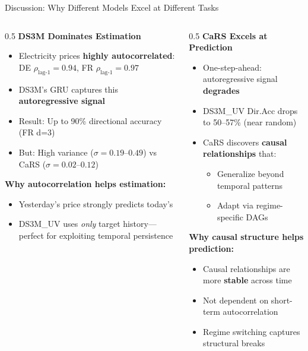\documentclass[aspectratio=169]{beamer}
\begin{document}
\begin{frame}{Discussion: Why Different Models Excel at Different Tasks}
\small
\begin{columns}
\begin{column}{0.5\textwidth}
\textbf{DS3M Dominates Estimation}
\begin{itemize}
    \item Electricity prices \textbf{highly autocorrelated}: DE $\rho_{\text{lag-1}} = 0.94$, FR $\rho_{\text{lag-1}} = 0.97$
    \item DS3M's GRU captures this \textbf{autoregressive signal}
    \item Result: Up to 90\% directional accuracy (FR d=3)
    \item \textcolor{warnred}{But:} High variance ($\sigma = 0.19$--$0.49$) vs CaRS ($\sigma = 0.02$--$0.12$)
\end{itemize}

\textbf{Why autocorrelation helps estimation:}
\begin{itemize}
    \item Yesterday's price strongly predicts today's
    \item DS3M\_UV uses \textit{only} target history---perfect for exploiting temporal persistence
\end{itemize}
\end{column}

\begin{column}{0.5\textwidth}
\textbf{CaRS Excels at Prediction}
\begin{itemize}
    \item One-step-ahead: autoregressive signal \textbf{degrades}
    \item DS3M\_UV Dir.Acc drops to 50--57\% (near random)
    \item CaRS discovers \textbf{causal relationships} that:
    \begin{itemize}
        \item Generalize beyond temporal patterns
        \item Adapt via regime-specific DAGs
    \end{itemize}
\end{itemize}

\textbf{Why causal structure helps prediction:}
\begin{itemize}
    \item Causal relationships are more \textbf{stable} across time
    \item Not dependent on short-term autocorrelation
    \item Regime switching captures structural breaks
\end{itemize}
\end{column}
\end{columns}
\end{frame}
\end{document}

